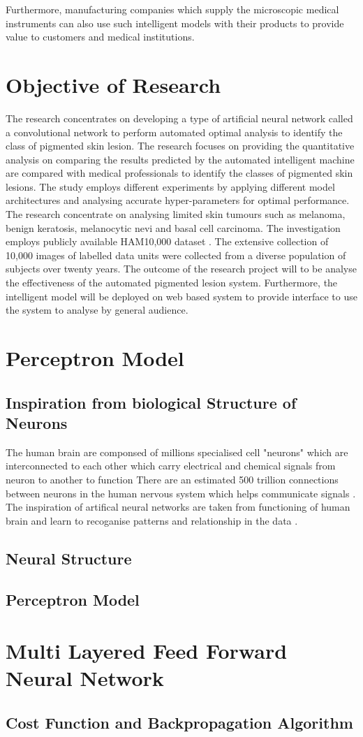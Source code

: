 Furthermore, manufacturing companies which supply the microscopic medical instruments can also use such intelligent models with their products to provide value to customers and medical institutions.

\section{Objective of Research}
The research concentrates on developing a type of artificial neural network called a convolutional network to perform automated optimal analysis to identify the class of pigmented skin lesion. 
The research focuses on providing the quantitative analysis on comparing the results predicted by the automated intelligent machine are compared with medical professionals to identify the classes of pigmented skin lesions. The study employs different experiments by applying different model architectures and analysing accurate hyper-parameters for optimal performance. 
The research concentrate on analysing limited skin tumours such as melanoma, 
benign keratosis, melanocytic nevi and basal cell carcinoma. 
The investigation employs publicly available HAM10,000 dataset \citep*{DVN/DBW86T_2018}. 
The extensive collection of 10,000 images of labelled data units were collected from a diverse population of subjects over twenty years.
The outcome of the research project will to be analyse the effectiveness of the automated pigmented 
lesion system. Furthermore, the intelligent model will be deployed on web based system to provide 
interface to use the system to analyse by general audience.
\pagebreak
\pagebreak

\section{Perceptron Model}
\subsection{Inspiration from biological Structure of Neurons}
The human brain are componsed of millions specialised cell "neurons" which are interconnected to each other which carry electrical and chemical signals from neuron to another to function
There are an estimated 500 trillion connections between neurons in the human nervous system which helps communicate signals \citep*{patterson2017deep}.
The inspiration of artifical neural networks are taken from functioning of human brain and learn to recoganise patterns and relationship in the data \citep*{AGATONOVICKUSTRIN2000717}. 
\subsection{Neural Structure}


\subsection{Perceptron Model}

\pagebreak
\section{Multi Layered Feed Forward Neural Network}

\pagebreak
\subsection{Cost Function and Backpropagation Algorithm}
